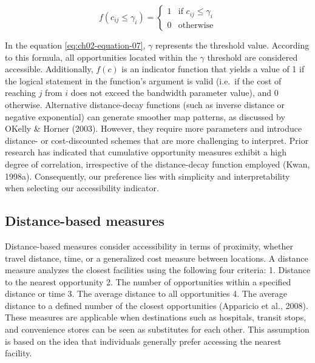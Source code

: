 \documentclass[
11pt, %
oneside, %
english, %
singlespacing, %
]{macthesis} %
\begin{document}
\begin{equation}
f(c_{ij} \le \gamma _i) = 
\begin{cases}
  1 & \text{if } c_{ij} \le \gamma _i \\
  0 & \text{otherwise}
\end{cases}
\label{eq:ch02-equation-07}
\end{equation}

In the equation \ref{eq:ch02-equation-07}, \(\gamma\) represents the threshold value. According to this formula, all opportunities located within the \(\gamma\) threshold are considered accessible. Additionally, \(f(c)\) is an indicator function that yields a value of 1 if the logical statement in the function's argument is valid (i.e.~if the cost of reaching \(j\) from \(i\) does not exceed the bandwidth parameter value), and 0 otherwise. Alternative distance-decay functions (such as inverse distance or negative exponential) can generate smoother map patterns, as discussed by OKelly \& Horner (2003). However, they require more parameters and introduce distance- or cost-discounted schemes that are more challenging to interpret. Prior research has indicated that cumulative opportunity measures exhibit a high degree of correlation, irrespective of the distance-decay function employed (Kwan, 1998a). Consequently, our preference lies with simplicity and interpretability when selecting our accessibility indicator.

\subsection{Distance-based measures}\label{distance-based-measures}

Distance-based measures consider accessibility in terms of proximity, whether travel distance, time, or a generalized cost measure between locations. A distance measure analyzes the closest facilities using the following four criteria:
1. Distance to the nearest opportunity
2. The number of opportunities within a specified distance or time
3. The average distance to all opportunities
4. The average distance to a defined number of the closest opportunities (Apparicio et al., 2008). These measures are applicable when destinations such as hospitals, transit stops, and convenience stores can be seen as substitutes for each other. This assumption is based on the idea that individuals generally prefer accessing the nearest facility.
\end{document}
